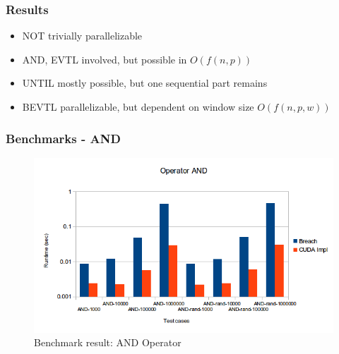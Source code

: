 \documentclass{beamer}
\begin{document}
\begin{frame}
\frametitle{Results}
\begin{itemize}
\item NOT trivially parallelizable
\item AND, EVTL involved, but possible in $O(f(n,p))$
\item UNTIL mostly possible, but one sequential part remains
\item BEVTL parallelizable, but dependent on window size $O(f(n,p,w))$
\end{itemize}
\end{frame}

\begin{frame}
\frametitle{Benchmarks - AND}
\begin{figure}[H]
    \includegraphics[scale=0.5]{bm_and.png}
    \caption{
        \label{fig:bm_and}
        Benchmark result: AND Operator}
\end{figure}
\end{frame}
\end{document}
